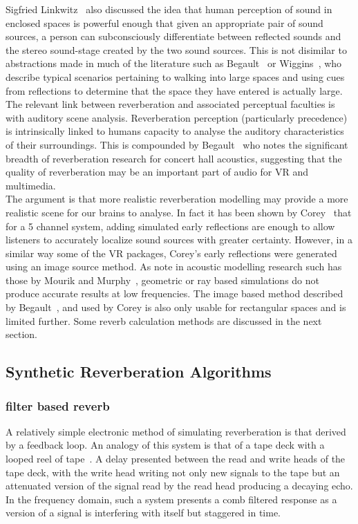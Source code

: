 \documentclass[paper=a4, fontsize=10pt, font=arial]{scrartcl} %
\numberwithin{equation}{section} %
\numberwithin{figure}{section} %
\numberwithin{table}{section} %
\begin{document}
Sigfried Linkwitz~\cite{Linkwitz2015} also discussed the idea that human perception of sound in enclosed spaces is powerful enough that given an appropriate pair of sound sources, a person can subconsciously differentiate between reflected sounds and the stereo sound-stage created by the two sound sources. This is not disimilar to abstractions made in much of the literature such as Begault~\cite{Begault1995} or Wiggins~\cite{Wiggins2004}, who describe typical scenarios pertaining to walking into large spaces and using cues from reflections to determine that the space they have entered is actually large. The relevant link between reverberation and associated perceptual faculties is with auditory scene analysis. Reverberation perception (particularly precedence) is intrinsically linked to humans capacity to analyse the auditory characteristics of their surroundings. This is compounded by Begault~\cite{Begault1995} who notes the significant breadth of reverberation research for concert hall acoustics, suggesting that the quality of reverberation may be an important part of audio for VR and multimedia.\\ 
The argument is that more realistic reverberation modelling may provide a more realistic scene for our brains to analyse. In fact it has been shown by Corey~\cite{Corey2002} that for a 5 channel system, adding simulated early reflections are enough to allow listeners to accurately localize sound sources with greater certainty. However, in a similar way some of the VR packages, Corey's early reflections were generated using an image source method. As note in acoustic modelling research such has those by Mourik and Murphy~\cite{Mourik2013}, geometric or ray based simulations do not produce accurate results at low frequencies. The image based method described by Begault~\cite{Begault1995}, and used by Corey is also only usable for rectangular spaces and is limited further. Some reverb calculation methods are discussed in the next section.

\subsection{Synthetic Reverberation Algorithms}
\subsubsection{filter based reverb}

A relatively simple electronic method of simulating reverberation is that derived by a feedback loop. An analogy of this system is that of a tape deck with a looped reel of tape~\cite{Begault1995}. A delay presented between the read and write heads of the tape deck, with the write head writing not only new signals to the tape but an attenuated version of the signal read by the read head producing a decaying echo. In the frequency domain, such a system presents a comb filtered response as a version of a signal is interfering with itself but staggered in time.\\ 
\end{document}
